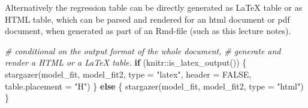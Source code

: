 \documentclass[
  12pt,
]{style/krantz}
\newenvironment{Shaded}{\begin{snugshade}}{\end{snugshade}}
\newcommand{\AttributeTok}[1]{\textcolor[rgb]{0.77,0.63,0.00}{#1}}
\newcommand{\CommentTok}[1]{\textcolor[rgb]{0.56,0.35,0.01}{\textit{#1}}}
\newcommand{\ConstantTok}[1]{\textcolor[rgb]{0.00,0.00,0.00}{#1}}
\newcommand{\ControlFlowTok}[1]{\textcolor[rgb]{0.13,0.29,0.53}{\textbf{#1}}}
\newcommand{\FunctionTok}[1]{\textcolor[rgb]{0.00,0.00,0.00}{#1}}
\newcommand{\NormalTok}[1]{#1}
\newcommand{\SpecialCharTok}[1]{\textcolor[rgb]{0.00,0.00,0.00}{#1}}
\newcommand{\StringTok}[1]{\textcolor[rgb]{0.31,0.60,0.02}{#1}}
\begin{document}
Alternatively the regression table can be directly generated as LaTeX table or as HTML table, which can be parsed and rendered for an html document or pdf document, when generated as part of an Rmd-file (such as this lecture notes).

\begin{Shaded}
\begin{Highlighting}[]
\CommentTok{\# conditional on the output format of the whole document,}
\CommentTok{\# generate and render a HTML or a LaTeX table.}
\ControlFlowTok{if}\NormalTok{ (knitr}\SpecialCharTok{::}\FunctionTok{is\_latex\_output}\NormalTok{()) \{}
     \FunctionTok{stargazer}\NormalTok{(model\_fit, model\_fit2, }\AttributeTok{type =} \StringTok{"latex"}\NormalTok{,}
               \AttributeTok{header =} \ConstantTok{FALSE}\NormalTok{, }\AttributeTok{table.placement =} \StringTok{"H"}\NormalTok{)}
\NormalTok{\} }\ControlFlowTok{else}\NormalTok{ \{}
     \FunctionTok{stargazer}\NormalTok{(model\_fit, model\_fit2, }\AttributeTok{type =} \StringTok{"html"}\NormalTok{)}
\NormalTok{\}}
\end{Highlighting}
\end{Shaded}
\end{document}
